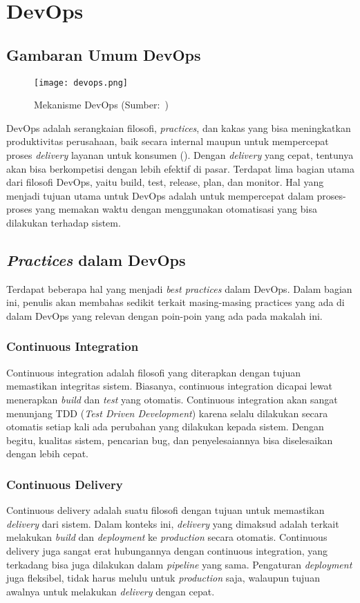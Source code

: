 \section{DevOps}

\subsection{Gambaran Umum DevOps}
\begin{figure}[h]
  \centering
  \texttt{[image: devops.png]}
  \caption{Mekanisme DevOps (Sumber:~\cite{devops})}
\end{figure}
DevOps adalah serangkaian filosofi, \textit{practices}, dan kakas yang bisa meningkatkan produktivitas perusahaan, baik secara internal maupun untuk mempercepat proses \textit{delivery} layanan untuk konsumen (\cite{devops}).
Dengan \textit{delivery} yang cepat, tentunya akan bisa berkompetisi dengan lebih efektif di pasar.
Terdapat lima bagian utama dari filosofi DevOps, yaitu build, test, release, plan, dan monitor.
Hal yang menjadi tujuan utama untuk DevOps adalah untuk mempercepat dalam proses-proses yang memakan waktu dengan menggunakan otomatisasi yang bisa dilakukan terhadap sistem.

\subsection{\textit{Practices} dalam DevOps}
Terdapat beberapa hal yang menjadi \textit{best practices} dalam DevOps. 
Dalam bagian ini, penulis akan membahas sedikit terkait masing-masing practices yang ada di dalam DevOps yang relevan dengan poin-poin yang ada pada makalah ini.

\subsubsection{Continuous Integration}
Continuous integration adalah filosofi yang diterapkan dengan tujuan memastikan integritas sistem.
Biasanya, continuous integration dicapai lewat menerapkan \textit{build} dan \textit{test} yang otomatis.
Continuous integration akan sangat menunjang TDD (\textit{Test Driven Development}) karena selalu dilakukan secara otomatis setiap kali ada perubahan yang dilakukan kepada sistem.
Dengan begitu, kualitas sistem, pencarian bug, dan penyelesaiannya bisa diselesaikan dengan lebih cepat.


\subsubsection{Continuous Delivery}
Continuous delivery adalah suatu filosofi dengan tujuan untuk memastikan \textit{delivery} dari sistem.
Dalam konteks ini, \textit{delivery} yang dimaksud adalah terkait melakukan \textit{build} dan \textit{deployment} ke \textit{production} secara otomatis.
Continuous delivery juga sangat erat hubungannya dengan continuous integration, yang terkadang bisa juga dilakukan dalam \textit{pipeline} yang sama.
Pengaturan \textit{deployment} juga fleksibel, tidak harus melulu untuk \textit{production} saja, walaupun tujuan awalnya untuk melakukan \textit{delivery} dengan cepat.

